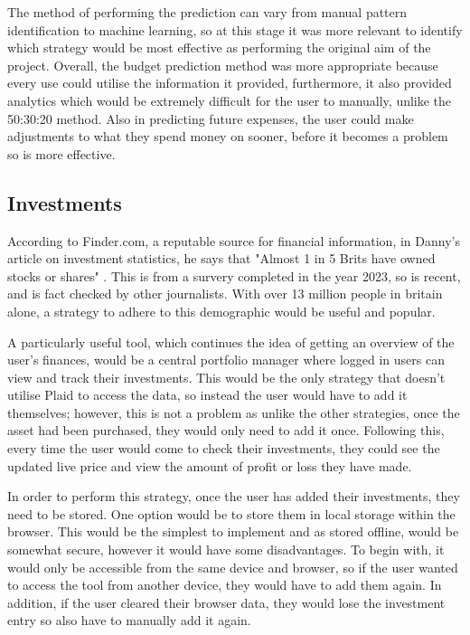 The method of performing the prediction can vary from manual pattern identification to machine learning, so at this stage it was more relevant to identify which strategy would be most effective as performing the original aim of the project. Overall, the budget prediction method was more appropriate because every use could utilise the information it provided, furthermore, it also provided analytics which would be extremely difficult for the user to manually, unlike the 50:30:20 method. Also in predicting future expenses, the user could make adjustments to what they spend money on sooner, before it becomes a problem so is more effective.

\subsection{Investments}
According to Finder.com, a reputable source for financial information, in Danny's article on investment statistics, he says that "Almost 1 in 5 Brits have owned stocks or shares" \cite{InvestmentStats}. This is from a survery completed in the year 2023, so is recent, and is fact checked by other journalists. With over 13 million people in britain alone, a strategy to adhere to this demographic would be useful and popular.

A particularly useful tool, which continues the idea of getting an overview of the user's finances, would be a central portfolio manager where logged in users can view and track their investments. This would be the only strategy that doesn't utilise Plaid to access the data, so instead the user would have to add it themselves; however, this is not a problem as unlike the other strategies, once the asset had been purchased, they would only need to add it once. Following this, every time the user would come to check their investments, they could see the updated live price and view the amount of profit or loss they have made.

In order to perform this strategy, once the user has added their investments, they need to be stored. One option would be to store them in local storage within the browser. This would be the simplest to implement and as stored offline, would be somewhat secure, however it would have some disadvantages. To begin with, it would only be accessible from the same device and browser, so if the user wanted to access the tool from another device, they would have to add them again. In addition, if the user cleared their browser data, they would lose the investment entry so also have to manually add it again.

